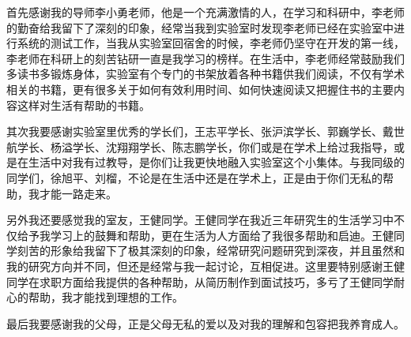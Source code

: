 \begin{thanks}

首先感谢我的导师李小勇老师，他是一个充满激情的人，在学习和科研中，李老师的勤奋给我留下了深刻的印象，经常当我到实验室时发现李老师已经在实验室中进行系统的测试工作，当我从实验室回宿舍的时候，李老师仍坚守在开发的第一线，李老师在科研上的刻苦钻研一直是我学习的榜样。在生活中，李老师经常鼓励我们多读书多锻炼身体，实验室有个专门的书架放着各种书籍供我们阅读，不仅有学术相关的书籍，更有很多关于如何有效利用时间、如何快速阅读又把握住书的主要内容这样对生活有帮助的书籍。

其次我要感谢实验室里优秀的学长们，王志平学长、张沪滨学长、郭巍学长、戴世航学长、杨溢学长、沈翔翔学长、陈志鹏学长，你们或是在学术上给过我指导，或是在生活中对我有过教导，是你们让我更快地融入实验室这个小集体。与我同级的同学们，徐旭平、刘榴，不论是在生活中还是在学术上，正是由于你们无私的帮助，我才能一路走来。

另外我还要感觉我的室友，王健同学。王健同学在我近三年研究生的生活学习中不仅给予我学习上的鼓舞和帮助，更在生活为人方面给了我很多帮助和启迪。王健同学刻苦的形象给我留下了极其深刻的印象，经常研究问题研究到深夜，并且虽然和我的研究方向并不同，但还是经常与我一起讨论，互相促进。这里要特别感谢王健同学在求职方面给我提供的各种帮助，从简历制作到面试技巧，多亏了王健同学耐心的帮助，我才能找到理想的工作。

最后我要感谢我的父母，正是父母无私的爱以及对我的理解和包容把我养育成人。
  
\end{thanks}
